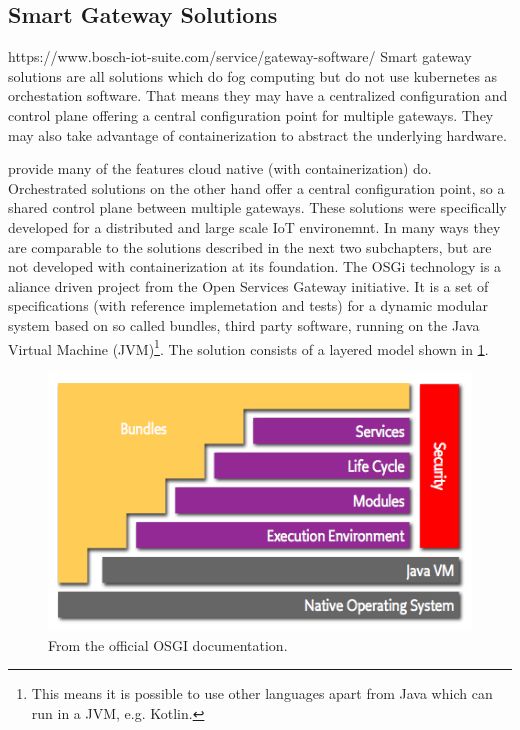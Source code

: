 \subsection{Smart Gateway Solutions}
https://www.bosch-iot-suite.com/service/gateway-software/
Smart gateway solutions are all solutions which do fog computing but do not use kubernetes as orchestation software. That means they may have a centralized configuration and control plane offering a central configuration point for multiple gateways. They may also take advantage of containerization to abstract the underlying hardware. 

provide many of the features cloud native (with containerization) do. Orchestrated solutions on the other hand offer a central configuration point, so a shared control plane between multiple gateways. These solutions were specifically developed for a distributed and large scale IoT environemnt. In many ways they are comparable to the solutions described in the next two subchapters, but are not developed with containerization at its foundation. The OSGi technology\cite{osgiDefintion25:online} is a aliance driven project from the Open Services Gateway initiative. It is a set of specifications (with reference implemetation and tests) for a dynamic modular system based on so called bundles, third party software, running on the Java Virtual Machine (JVM)\footnote{This means it is possible to use other languages apart from Java which can run in a JVM, e.g. Kotlin.}. The solution consists of a layered model shown in \cref{fig:osgiLayerModel}. 
\begin{figure}[h!]
    \centering
    \includegraphics[scale=0.8]{figures/layering-osgi.png}
    \caption{From the official OSGI documentation\cite{osgiFrameworkArchitec22:online}.}
    \label{fig:osgiLayerModel}
\end{figure}
